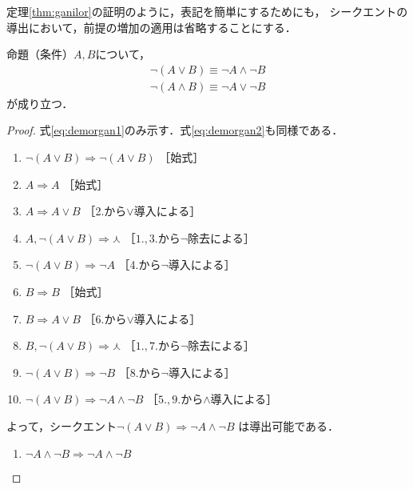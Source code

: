    定理\ref{thm:ganilor}の証明のように，表記を簡単にするためにも，
   シークエントの導出において，前提の増加の適用は省略することにする．
   
   \begin{thm} \label{thm:demorganmeidai}
     命題（条件）$A,  B$について，
     \begin{align}
       \lnot ( A \lor B ) \equiv \lnot A \land \lnot B
       \label{eq:demorgan1} \\
       \lnot ( A \land B ) \equiv \lnot A \lor \lnot B
       \label{eq:demorgan2}
     \end{align}
     が成り立つ．
   \end{thm}
   \begin{proof}
     式\eqref{eq:demorgan1}のみ示す．式\eqref{eq:demorgan2}も同様である．
     \begin{enumerate}[1. ]
       \item $\lnot ( A \lor B ) \Longrightarrow \lnot ( A \lor B ) $ \quad ［始式］
       \item $ A \Longrightarrow A$ \quad ［始式］
       \item $A \Longrightarrow A \lor B $ \quad ［2.から$\lor$導入による］
       \item $A,  \lnot ( A \lor B ) \Longrightarrow \curlywedge$ 
              \quad ［$1., 3.$から$\lnot$除去による］
       \item $\lnot ( A \lor B ) \Longrightarrow \lnot A $ \quad ［4.から$\lnot$導入による］
       \item $B \Longrightarrow B$ \quad ［始式］
       \item $B \Longrightarrow A \lor B$ \quad ［6.から$\lor$導入による］
       \item $B,  \lnot ( A \lor B ) \Longrightarrow \curlywedge$
              \quad ［$1., 7.$から$\lnot$除去による］
       \item $\lnot ( A \lor B ) \Longrightarrow \lnot B$ 
              \quad ［8.から$\lnot$導入による］
       \item $\lnot ( A \lor B ) \Longrightarrow \lnot A \land \lnot B$
              \quad ［$5., 9.$から$\land$導入による］
     \end{enumerate}
     よって，シークエント$\lnot ( A \lor B ) \Longrightarrow \lnot A \land \lnot B$
     は導出可能である．
     \begin{enumerate}[1. ]
       \item $\lnot A \land \lnot B \Longrightarrow \lnot A \land \lnot B$

\end{enumerate}
\end{proof}
